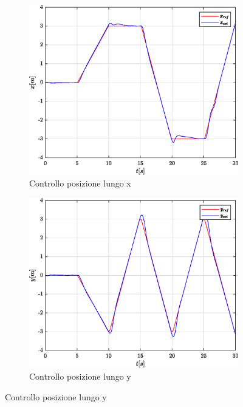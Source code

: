 \begin{figure}
	\centering
	\begin{subfigure}{0.45\textwidth}
		\centering
		\includegraphics[width=1\textwidth]{Simulazioni/Figure/SMC/BUTTERFLY/PositionControlXPos}
		\caption{Controllo posizione lungo x}
		\label{fig:BUTTERFLYerrposxSMC}
	\end{subfigure}
	\hfill
	\begin{subfigure}{0.45\textwidth}
		\centering
		\includegraphics[width=1\textwidth]{Simulazioni/Figure/SMC/BUTTERFLY/PositionControlYPos}
		\caption{Controllo posizione lungo y}

\end{subfigure}
\end{figure}
